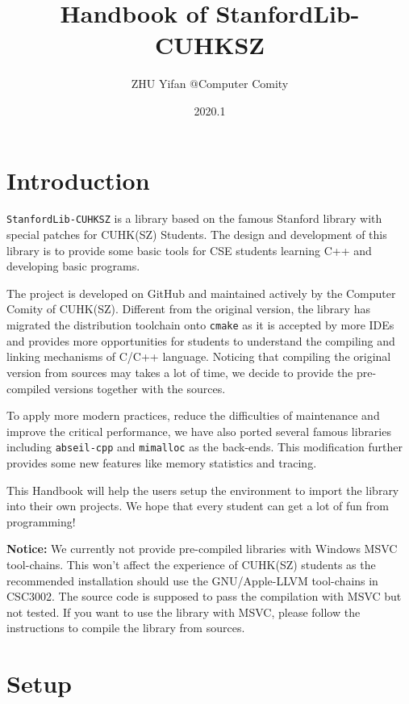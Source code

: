 \documentclass[a4paper,12pt]{report}
\begin{document}
\author{ZHU Yifan @Computer Comity}
\title{Handbook of StanfordLib-CUHKSZ}
\date{2020.1}

\maketitle
\tableofcontents
\chapter{Introduction}

\texttt{StanfordLib-CUHKSZ} is a library based on the famous Stanford library with special patches for CUHK(SZ) Students. The design and development of this library is to provide some basic tools for CSE students learning C++ and developing basic programs.

The project is developed on GitHub and maintained actively by the Computer Comity of CUHK(SZ). Different from the original version, the library has migrated the distribution toolchain onto \texttt{cmake} as it is accepted by more IDEs and provides more opportunities for students to understand the compiling and linking mechanisms of C/C++ language. Noticing that compiling the original version from sources may takes a lot of time, we decide to provide the pre-compiled versions together with the sources. 

To apply more modern practices, reduce the difficulties of maintenance and improve the critical performance, we have also ported several famous libraries including \texttt{abseil-cpp} and \texttt{mimalloc} as the back-ends. This modification further provides some new features like memory statistics and tracing.

This Handbook will help the users setup the environment to import the library into their own projects. We hope that every student can get a lot of fun from programming!

\textbf{Notice: } We currently not provide pre-compiled libraries with Windows MSVC tool-chains. This won't affect the experience of CUHK(SZ) students as the recommended installation should use the GNU/Apple-LLVM tool-chains in CSC3002. The source code is supposed to pass the compilation with MSVC but not tested. If you want to use the library with MSVC, please follow the instructions to compile the library from sources.

\chapter{Setup}
\end{document}
